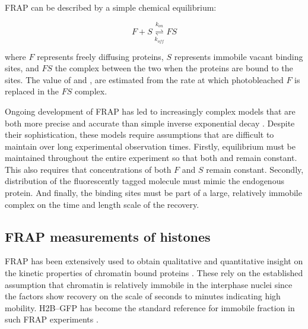    FRAP can be described by a simple chemical equilibrium:

    \begin{displaymath}
      F + S \overset{k_{on}}{\underset{k_{off}}{\rightleftharpoons}} FS
    \end{displaymath}

    where $F$ represents freely diffusing proteins,
    $S$ represents immobile vacant binding sites,
    and $FS$ the complex between the two when the proteins are bound to the sites. 
    The value of \Kon{} and \Koff{},
    are estimated from the rate at which photobleached $F$ is replaced in the $FS$ complex.

    Ongoing development of FRAP has led to increasingly complex models
    that are both more precise and accurate than simple
    inverse exponential decay \citep{mcnally-frap-2010}.
    Despite their sophistication, these models require assumptions
    that are difficult to maintain over long experimental observation times.
    Firstly, equilibrium must be maintained throughout the entire experiment 
    so that both \Kon{} and \Koff{} remain constant.
    This also requires that concentrations of both $F$ and $S$ remain constant.
    Secondly, distribution of the fluorescently tagged molecule must mimic the endogenous protein.
    And finally, the binding sites must be part of a large, relatively immobile complex
    on the time and length scale of the recovery.

  \subsection{FRAP measurements of histones}

    FRAP has been extensively used to obtain qualitative and
    quantitative insight on the kinetic properties of chromatin bound
    proteins \citep{phair2000high, essers2005nuclear, agresti2005gr}.
    These rely on the established assumption that chromatin is
    relatively immobile in the interphase nuclei
    \citep{abney1997chromatin} since the factors show recovery
    on the scale of seconds to minutes indicating high mobility.
    H2B--GFP \citep{KevinH2BGFP} has become
    the standard reference for immobile fraction in such
    FRAP experiments \citep{dey2000bromodomain}.


